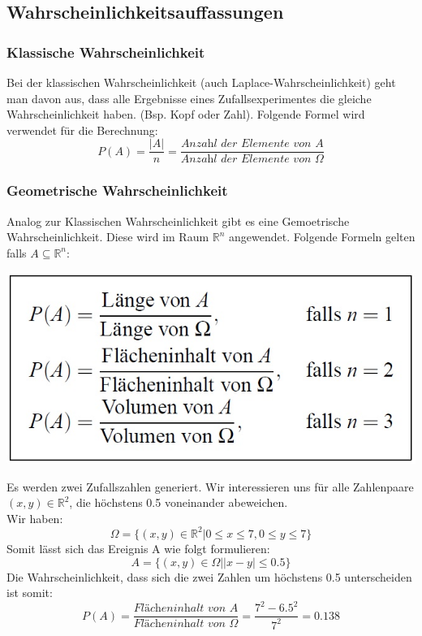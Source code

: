 \documentclass[12pt,a4paper]{article} %
\begin{document}
\subsection{Wahrscheinlichkeitsauffassungen}

\subsubsection{Klassische Wahrscheinlichkeit}

Bei der klassischen Wahrscheinlichkeit (auch Laplace-Wahrscheinlichkeit) geht man davon aus, dass alle Ergebnisse eines Zufallsexperimentes die gleiche Wahrscheinlichkeit haben. (Bsp. Kopf oder Zahl). Folgende Formel wird verwendet für die Berechnung:
$$P(A) = \frac{|A|}{n} = \frac{\textit{Anzahl der Elemente von A}}{\textit{Anzahl der Elemente von }\Omega}$$

\subsubsection{Geometrische Wahrscheinlichkeit}

Analog zur Klassischen Wahrscheinlichkeit gibt es eine Gemoetrische Wahrscheinlichkeit. Diese wird im Raum $\mathbb{R}^n$ angewendet. Folgende Formeln gelten falls $A \subseteq \mathbb{R}^n$:


\begin{center}
\includegraphics[scale=0.7]{geoWahrscheinlichkeit.jpg}
\end{center}

Es werden zwei Zufallszahlen generiert. Wir interessieren uns für alle Zahlenpaare $(x,y) \in \mathbb{R}^2$, die höchstens 0.5 voneinander abeweichen.\\
Wir haben: $$\Omega = \{(x,y) \in \mathbb{R}^2 | 0 \le x \le 7, 0 \le y	 \le 7\}$$
Somit lässt sich das Ereignis A wie folgt formulieren:
$$A = \{(x,y) \in \Omega || x-y | \le 0.5\}$$
Die Wahrscheinlichkeit, dass sich die zwei Zahlen um höchstens 0.5 unterscheiden ist somit:
$$P(A) = \frac{\textit{Flächeninhalt von A}}{\textit{Flächeninhalt von }\Omega} = \frac{7^2 - 6.5^2}{7^2} = 0.138$$
\end{document}
